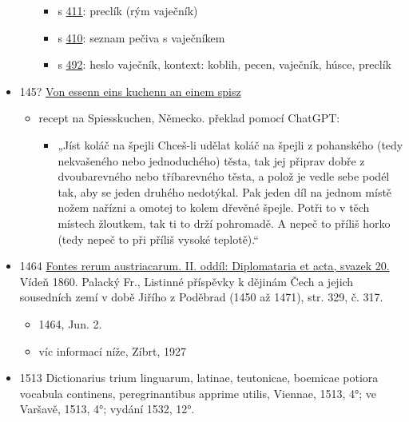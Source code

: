 \begin{itemize}
\begin{itemize}
    \begin{itemize}
    \tightlist
    \item
      s
      \href{https://sources.cms.flu.cas.cz/src/index.php?s=v&zoom=y&bookid=833&page=411&ft=vaje\%C4\%8Dn\%C3\%ADk}{411}:
      preclík (rým vaječník)
    \item
      s
      \href{https://sources.cms.flu.cas.cz/src/index.php?s=v&zoom=y&bookid=833&page=413&ft=vaje\%C4\%8Dn\%C3\%ADk}{410}:
      seznam pečiva s vaječníkem
    \item
      s
      \href{https://sources.cms.flu.cas.cz/src/index.php?s=v&bookid=833&page=495}{492}:
      heslo vaječník, kontext: koblih, pecen, vaječník, húsce, preclík
    \end{itemize}
  \end{itemize}
\item
  145? \href{https://gams.uni-graz.at/o:corema.h2a.46}{Von essenn eins
  kuchenn an einem spisz}

  \begin{itemize}
  \tightlist
  \item
    recept na Spiesskuchen, Německo. překlad pomocí ChatGPT:

    \begin{itemize}
    \tightlist
    \item
      „Jíst koláč na špejli Chceš-li udělat koláč na špejli z pohanského
      (tedy nekvašeného nebo jednoduchého) těsta, tak jej připrav dobře
      z dvoubarevného nebo tříbarevného těsta, a polož je vedle sebe
      podél tak, aby se jeden druhého nedotýkal. Pak jeden díl na jednom
      místě nožem nařízni a omotej to kolem dřevěné špejle. Potři to v
      těch místech žloutkem, tak ti to drží pohromadě. A nepeč to příliš
      horko (tedy nepeč to při příliš vysoké teplotě).``
    \end{itemize}
  \end{itemize}
\item
  1464
  \href{https://www.digitale-sammlungen.de/view/bsb10798133?page=354\%2C355}{Fontes
  rerum austriacarum. II. oddíl: Diplomataria et acta, svazek 20.} Vídeň
  1860. Palacký Fr., Listinné příspěvky k dějinám Čech a jejich
  sousedních zemí v době Jiřího z Poděbrad (1450 až 1471), str. 329, č.
  317.

  \begin{itemize}
  \tightlist
  \item
    1464, Jun. 2.
  \item
    víc informací níže, Zíbrt, 1927
  \end{itemize}
\item
  1513 Dictionarius trium linguarum, latinae, teutonicae, boemicae
  potiora vocabula continens, peregrinantibus apprime utilis, Viennae,
  1513, 4°; ve Varšavě, 1513, 4°; vydání 1532, 12°.


\end{itemize}
